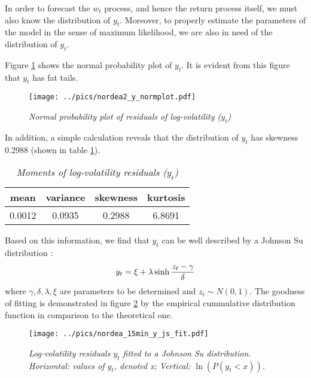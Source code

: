 In order to forecast the $w_t$ process, and hence the return process
itself, we must also know the distribution of $y_t$. Moreover, to
properly estimate the parameters of the model in the sense of maximum
likelihood, we are also in need of the distribution of $y_t$.

Figure \ref{fig:nordea_15min_y_qq} shows the normal probability plot of
$y_t$. It is evident from this figure that $y_t$ has fat tails.
\begin{figure}[htb!]
  \centering
  \texttt{[image: ../pics/nordea2\_y\_normplot.pdf]}
  \caption{\small \it Normal probability plot of residuals of
    log-volatility ($y_t$)}
  \label{fig:nordea_15min_y_qq}
\end{figure}
In addition, a simple calculation reveals that the distribution of
$y_t$ has skewness 0.2988 (shown in table
\ref{tab:nordea_15min_y_moments}).
\begin{table}[htb!]
  \centering
  \begin{tabular}{|c|c|c|c|}
    \hline
    mean & variance & skewness & kurtosis \\
    \hline
    0.0012 & 0.0935 & 0.2988 & 6.8691 \\
    \hline
  \end{tabular}
  \caption{\small \it Moments of log-volatility residuals ($y_t$)}
  \label{tab:nordea_15min_y_moments}
\end{table}
Based on this information, we find that $y_t$ can be well
described by a Johnson Su distribution \cite{Shang2004}:
\[
  y_t = \xi + \lambda\sinh{z_t - \gamma \over \delta}
\]
where $\gamma, \delta, \lambda, \xi$ are parameters to be determined
and $z_t \sim N(0, 1)$. The goodness of fitting is demonstrated in
figure \ref{fig:nordea_15min_y_js_fit} by the
empirical cummulative distribution function in comparison to the
theoretical one.
\begin{figure}[htb!]
  \centering
    \texttt{[image: ../pics/nordea\_15min\_y\_js\_fit.pdf]}
    \caption{\small \it Log-volatility residuals $y_t$ fitted to a
      Johnson Su distribution. Horizontal: values of $y_t$, denoted x;
      Vertical: $\ln\left(P(y_t < x)\right)$.}
    \label{fig:nordea_15min_y_js_fit}
\end{figure}

